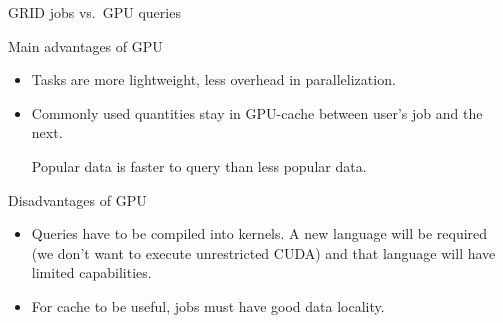 \documentclass{beamer}
\begin{document}
\begin{frame}{GRID jobs vs.\ GPU queries}
\vspace{0.5 cm}
\begin{block}{Main advantages of GPU}
\begin{itemize}
\item Tasks are more lightweight, less overhead in parallelization.
\item Commonly used quantities stay in GPU-cache between user's job and the next.

\vspace{0.1 cm}
Popular data is faster to query than less popular data.
\end{itemize}
\end{block}

\begin{block}{Disadvantages of GPU}
\begin{itemize}
\item Queries have to be compiled into kernels. A new language will be required (we don't want to execute unrestricted CUDA) and that language will have limited capabilities.
\item For cache to be useful, jobs must have good data locality.
\end{itemize}
\end{block}
\end{frame}
\end{document}
